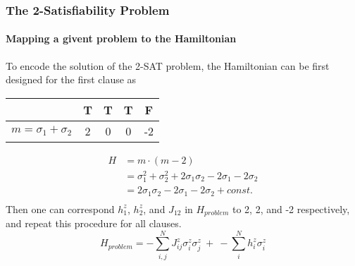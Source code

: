 \documentclass{beamer}
\begin{document}
\begin{frame}
	\frametitle{The 2-Satisfiability Problem}
	\framesubtitle{Mapping a givent problem to the Hamiltonian}
	
	To encode the solution of the 2-SAT problem, the Hamiltonian can be first designed for the first clause as 
	\begin{center}
		\begin{tabular}{|c|c|c|c|c|}
			
			\hline
			& T & T & T & F \\
			\hline
			\hline
			$m=\sigma_1+\sigma_2$ & 2 & 0 & 0 & -2 \\
			\hline
		\end{tabular} 
	\end{center}
	\begin{equation*}
	\begin{split}
	H & = m \cdot (m-2)\\
	& = \sigma_1^2 + \sigma_2^2 + 2\sigma_1 \sigma_2 -2\sigma_1 -2\sigma_2\\
	& = 2\sigma_1 \sigma_2 -2\sigma_1 -2\sigma_2 + const.\\
	\end{split}
	\end{equation*}
	Then one can correspond $h_1^z$, $h_2^z$, and $J_{12}$ in $H_{problem}$ to 2, 2, and -2 respectively, and repeat this procedure for all clauses. 
	\begin{equation*}
	H_{problem}= -\sum_{i,j}^N J_{ij}^z \sigma^z_i \sigma^z_j ~+~- \sum_{i}^N h_i^z \sigma^z_i
	\end{equation*} 
	
	
\end{frame}

\end{document}

